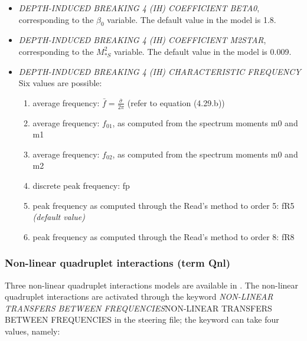 \begin{itemize}
\item  \textit{DEPTH-INDUCED BREAKING 4 (IH) COEFFICIENT BETA0}, corresponding to the $\beta _{0} $ variable. The default value in the model is 1.8.

\item  \textit{DEPTH-INDUCED BREAKING 4 (IH) COEFFICIENT M2STAR}, corresponding to the $M_{*S}^{2} $ variable. The default value in the model is 0.009.

 \item \textit{DEPTH-INDUCED BREAKING 4 (IH) CHARACTERISTIC FREQUENCY} Six values are possible:
\begin{enumerate}

 \item average frequency: $\bar{f}=\frac{\bar{\sigma }}{2\pi } $  (refer to equation (4.29.b))

 \item average frequency: $f_{01} $, as computed from the spectrum moments m0 and m1

 \item average frequency: $f_{02} $, as computed from the spectrum moments m0 and m2

 \item discrete peak frequency: fp

 \item peak frequency as computed through the Read's method to order 5: fR5 \textit{(default value)}

 \item peak frequency as computed through the Read's method to order 8: fR8
\end{enumerate}
\end{itemize}


\subsubsection{ Non-linear quadruplet interactions (term Qnl)}

 Three non-linear quadruplet interactions models are available in \tomawac. The non-linear quadruplet interactions are activated through the keyword \textit{NON-LINEAR TRANSFERS BETWEEN FREQUENCIES}NON-LINEAR TRANSFERS BETWEEN FREQUENCIES\textit{ }in the steering file; the keyword can take four values, namely:

